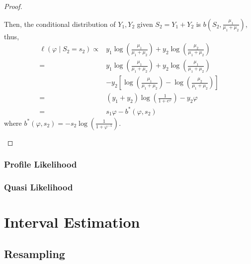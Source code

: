 \begin{proof}
\begin{enumerate}
              Then, the conditional distribution of $Y_{1},Y_{2}$ given $S_{2}=Y_{1}+Y_{2}$ is $b\left(S_{2},\frac{\mu_{1}}{\mu_{1}+\mu_{2}}\right)$, thus,
              \begin{equation*}
                  \begin{aligned}
                      \ell\left(\varphi\mid S_{2}=s_{2}\right)\propto & y_{1}\log\left(\frac{\mu_{1}}{\mu_{1}+\mu_{2}}\right)+y_{2}\log\left(\frac{\mu_{2}}{\mu_{1}+\mu_{2}}\right)          \\
                      =                                               & y_{1}\log\left(\frac{\mu_{1}}{\mu_{1}+\mu_{2}}\right)+y_{2}\log\left(\frac{\mu_{1}}{\mu_{1}+\mu_{2}}\right)          \\
                                                                      & -y_{2}\left[\log\left(\frac{\mu_{1}}{\mu_{1}+\mu_{2}}\right)-\log\left(\frac{\mu_{2}}{\mu_{1}+\mu_{2}}\right)\right] \\
                      =                                               & \left(y_{1}+y_{2}\right)\log\left(\frac{1}{1+e^{\varphi}}\right)-y_{2}\varphi                                        \\
                      =                                               & s_{1}\varphi-b^{*}\left(\varphi,s_{2}\right)
                  \end{aligned}
              \end{equation*}
              where $b^{*}\left(\varphi,s_{2}\right)=-s_{2}\log\left(\frac{1}{1+\varphi^{-1}}\right)$.
    \end{enumerate}
\end{proof}

\subsubsection{Profile Likelihood}

\subsubsection{Quasi Likelihood}

\section{Interval Estimation}

\subsection{Resampling}

